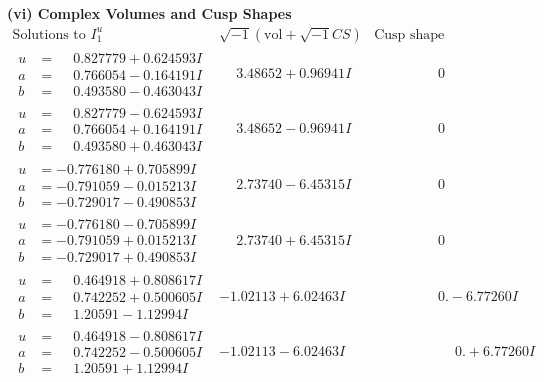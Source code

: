 \documentclass[1p]{elsarticle_modified}
\theoremstyle{definition}
\newcommand{\I}{\sqrt{-1}}
\begin{document}
\newpage\flushleft \textbf{(vi) Complex Volumes and Cusp Shapes}
$$\begin{array}{c|c|c}  
\text{Solutions to }I^u_{1}& \I (\text{vol} + \sqrt{-1}CS) & \text{Cusp shape}\\
 \hline 
\begin{aligned}
u &= \phantom{-}0.827779 + 0.624593 I \\
a &= \phantom{-}0.766054 - 0.164191 I \\
b &= \phantom{-}0.493580 - 0.463043 I\end{aligned}
 & \phantom{-}3.48652 + 0.96941 I & \phantom{-0.000000 } 0 \\ \hline\begin{aligned}
u &= \phantom{-}0.827779 - 0.624593 I \\
a &= \phantom{-}0.766054 + 0.164191 I \\
b &= \phantom{-}0.493580 + 0.463043 I\end{aligned}
 & \phantom{-}3.48652 - 0.96941 I & \phantom{-0.000000 } 0 \\ \hline\begin{aligned}
u &= -0.776180 + 0.705899 I \\
a &= -0.791059 - 0.015213 I \\
b &= -0.729017 - 0.490853 I\end{aligned}
 & \phantom{-}2.73740 - 6.45315 I & \phantom{-0.000000 } 0 \\ \hline\begin{aligned}
u &= -0.776180 - 0.705899 I \\
a &= -0.791059 + 0.015213 I \\
b &= -0.729017 + 0.490853 I\end{aligned}
 & \phantom{-}2.73740 + 6.45315 I & \phantom{-0.000000 } 0 \\ \hline\begin{aligned}
u &= \phantom{-}0.464918 + 0.808617 I \\
a &= \phantom{-}0.742252 + 0.500605 I \\
b &= \phantom{-}1.20591 - 1.12994 I\end{aligned}
 & -1.02113 + 6.02463 I & \phantom{-0.000000 } 0. - 6.77260 I \\ \hline\begin{aligned}
u &= \phantom{-}0.464918 - 0.808617 I \\
a &= \phantom{-}0.742252 - 0.500605 I \\
b &= \phantom{-}1.20591 + 1.12994 I\end{aligned}
 & -1.02113 - 6.02463 I & \phantom{-0.000000 -}0. + 6.77260 I \\ \hline\begin{aligned}

\end{aligned}
\end{array}$$
\end{document}
